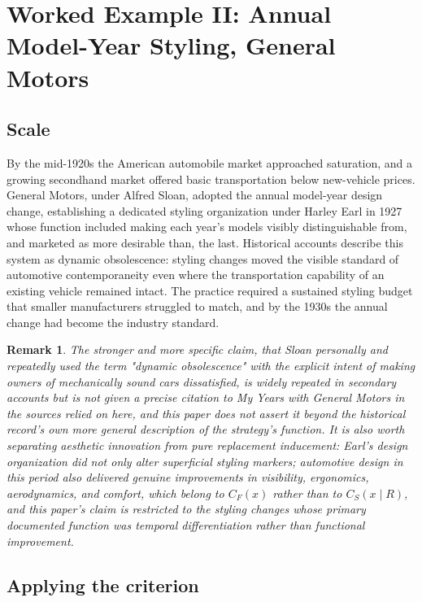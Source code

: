 \documentclass[11pt]{article}
\newtheorem{remark}[definition]{Remark}
\begin{document}
\section{Worked Example II: Annual Model-Year Styling, General Motors}

\subsection{Scale}

By the mid-1920s the American automobile market approached saturation, and a growing secondhand market offered basic transportation below new-vehicle prices. General Motors, under Alfred Sloan, adopted the annual model-year design change, establishing a dedicated styling organization under Harley Earl in 1927 whose function included making each year's models visibly distinguishable from, and marketed as more desirable than, the last. Historical accounts describe this system as dynamic obsolescence: styling changes moved the visible standard of automotive contemporaneity even where the transportation capability of an existing vehicle remained intact. The practice required a sustained styling budget that smaller manufacturers struggled to match, and by the 1930s the annual change had become the industry standard.

\begin{remark}
The stronger and more specific claim, that Sloan personally and repeatedly used the term "dynamic obsolescence" with the explicit intent of making owners of mechanically sound cars dissatisfied, is widely repeated in secondary accounts but is not given a precise citation to \emph{My Years with General Motors} in the sources relied on here, and this paper does not assert it beyond the historical record's own more general description of the strategy's function. It is also worth separating aesthetic innovation from pure replacement inducement: Earl's design organization did not only alter superficial styling markers; automotive design in this period also delivered genuine improvements in visibility, ergonomics, aerodynamics, and comfort, which belong to $C_F(x)$ rather than to $C_S(x\mid R)$, and this paper's claim is restricted to the styling changes whose primary documented function was temporal differentiation rather than functional improvement.
\end{remark}

\subsection{Applying the criterion}
\end{document}
